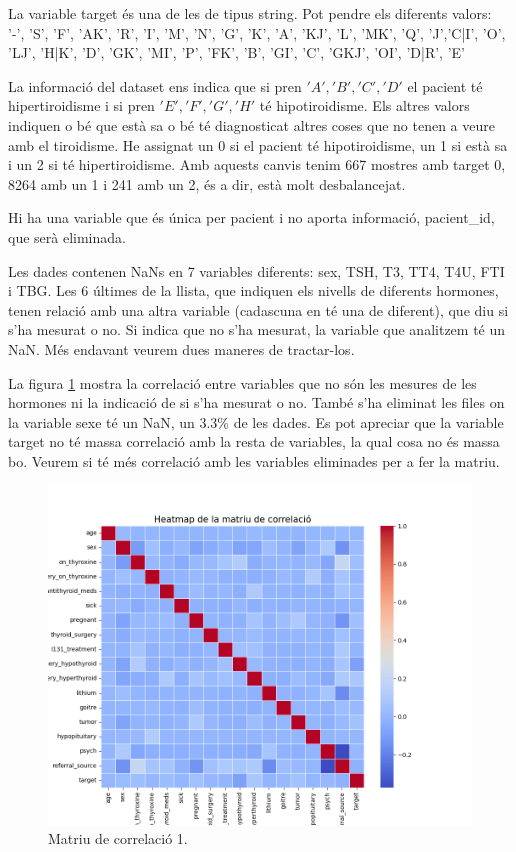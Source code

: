 \documentclass[9pt,a4paper,twoside]{tau-class/tau}
\begin{document}
    La variable target és una de les de tipus string. Pot pendre els diferents valors: 
    '-', 'S', 'F', 'AK', 'R', 'I', 'M', 'N', 'G', 'K', 'A', 'KJ', 'L', 'MK', 'Q', 'J','C|I', 'O', 'LJ', 'H|K', 'D', 'GK', 'MI', 'P', 'FK', 'B', 'GI', 'C', 'GKJ', 'OI', 'D|R', 'E'

    La informació del dataset ens indica que si pren $'A', 'B', 'C', 'D'$ el pacient té hipertiroidisme i si pren $'E', 'F', 'G', 'H'$ té hipotiroidisme. Els altres valors indiquen o bé que està sa o bé té diagnosticat altres coses que no tenen a veure amb el tiroidisme. He assignat un 0 si el pacient té hipotiroidisme, un 1 si està sa i un 2 si té hipertiroidisme. Amb aquests canvis tenim 667 mostres amb target 0, 8264 amb un 1 i 241 amb un 2, és a dir, està molt desbalancejat.
    
    Hi ha una variable que és única per pacient i no aporta informació, pacient\_id, que serà eliminada.

    Les dades contenen NaNs en 7 variables diferents: sex, TSH, T3, TT4, T4U, FTI i TBG. Les 6 últimes de la llista, que indiquen els nivells de diferents hormones, tenen relació amb una altra variable (cadascuna en té una de diferent), que diu si s'ha mesurat o no. Si indica que no s'ha mesurat, la variable que analitzem té un NaN. Més endavant veurem dues maneres de tractar-los.

    La figura \ref{fig:figure1} mostra la correlació entre variables que no són les mesures de les hormones ni la indicació de si s'ha mesurat o no. També s'ha eliminat les files on la variable sexe té un NaN, un 3.3\% de les dades. Es pot apreciar que la variable target no té massa correlació amb la resta de variables, la qual cosa no és massa bo. Veurem si té més correlació amb les variables eliminades per a fer la matriu.

    \begin{figure}[H]
		\centering
		\includegraphics[width=0.75\columnwidth]{correlation_matrix_atributs_no_mesures.png}
		\caption{Matriu de correlació 1.}
		\label{fig:figure1}
	\end{figure}
\end{document}
